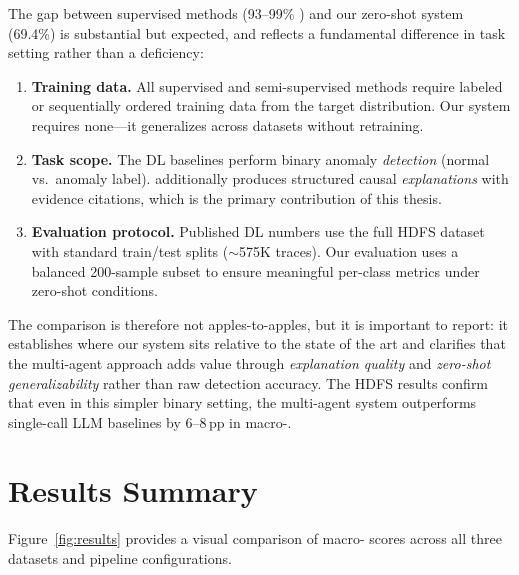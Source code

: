 The gap between supervised methods (93--99\% \fone{}) and our zero-shot system (69.4\%)
is substantial but expected, and reflects a fundamental difference in task setting rather
than a deficiency:
\begin{enumerate}
  \item \textbf{Training data.} All supervised and semi-supervised methods require
        labeled or sequentially ordered training data from the target distribution.
        Our system requires none---it generalizes across datasets without retraining.
  \item \textbf{Task scope.} The DL baselines perform binary anomaly \emph{detection}
        (normal vs.\ anomaly label). \systemname{} additionally produces structured
        causal \emph{explanations} with evidence citations, which is the primary
        contribution of this thesis.
  \item \textbf{Evaluation protocol.} Published DL numbers use the full HDFS dataset
        with standard train/test splits (${\sim}$575K traces). Our evaluation uses a
        balanced 200-sample subset to ensure meaningful per-class metrics under
        zero-shot conditions.
\end{enumerate}
The comparison is therefore not apples-to-apples, but it is important to report: it
establishes where our system sits relative to the state of the art and clarifies that
the multi-agent approach adds value through \emph{explanation quality} and
\emph{zero-shot generalizability} rather than raw detection accuracy. The HDFS results
confirm that even in this simpler binary setting, the multi-agent system outperforms
single-call LLM baselines by 6--8\,pp in macro-\fone{}.

\section{Results Summary}

Figure~\ref{fig:results} provides a visual comparison of macro-\fone{} scores across all three
datasets and pipeline configurations.

